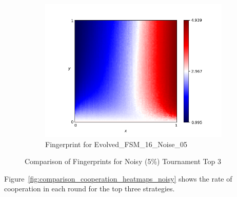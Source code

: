 \documentclass{article}
\begin{document}
\begin{figure}[!hbtp]
\begin{subfigure}[t]{.3\textwidth}
        \includegraphics[width=\textwidth]{./assets/Evolved_FSM_16_Noise_05.png}
        \caption{Fingerprint for Evolved\_FSM\_16\_Noise\_05}
    \end{subfigure}%

    \caption{Comparison of Fingerprints for Noisy (5\%) Tournament Top 3}
    \label{fig:comparison_fingerprint_noisy}
\end{figure}

Figure~\ref{fig:comparison_cooperation_heatmaps_noisy} shows the rate of
cooperation in each round for the top three strategies.
\end{document}
